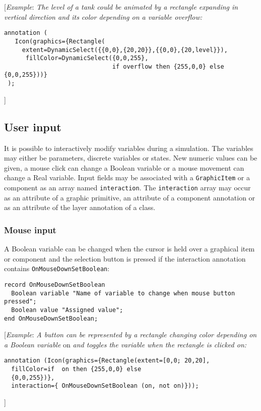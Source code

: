 {[}\emph{Example}: \emph{The level of a tank could be animated by a
rectangle expanding in vertical direction and its color depending on a
variable overflow:}
\begin{lstlisting}[language=modelica]
  annotation (
   Icon(graphics={Rectangle(
     extent=DynamicSelect({{0,0},{20,20}},{{0,0},{20,level}}),
      fillColor=DynamicSelect({0,0,255},
                              if overflow then {255,0,0} else {0,0,255}))}
 );
\end{lstlisting}
{]}

\subsection{User input}

It is possible to interactively modify variables during a simulation.
The variables may either be parameters, discrete variables or states.
New numeric values can be given, a mouse click can change a Boolean
variable or a mouse movement can change a Real variable. Input fields
may be associated with a \lstinline!GraphicItem! or a component as an array named
\lstinline!interaction!. The \lstinline!interaction! array may occur as an attribute of a
graphic primitive, an attribute of a component annotation or as an
attribute of the layer annotation of a class.

\subsubsection{Mouse input}

A Boolean variable can be changed when the cursor is held over a
graphical item or component and the selection button is pressed if the
interaction annotation contains \lstinline!OnMouseDownSetBoolean!:

\begin{lstlisting}[language=modelica]
record OnMouseDownSetBoolean
  Boolean variable "Name of variable to change when mouse button pressed";
  Boolean value "Assigned value";
end OnMouseDownSetBoolean;
\end{lstlisting}
{[}\emph{Example}: \emph{A button can be represented by a rectangle
changing color depending on a Boolean variable} on \emph{and toggles the
variable when the rectangle is clicked on:}

\begin{lstlisting}[language=modelica]
  annotation (Icon(graphics={Rectangle(extent=[0,0; 20,20],
  fillColor=if  on then {255,0,0} else
  {0,0,255})},
  interaction={ OnMouseDownSetBoolean (on, not on)}));
\end{lstlisting}
{]}

